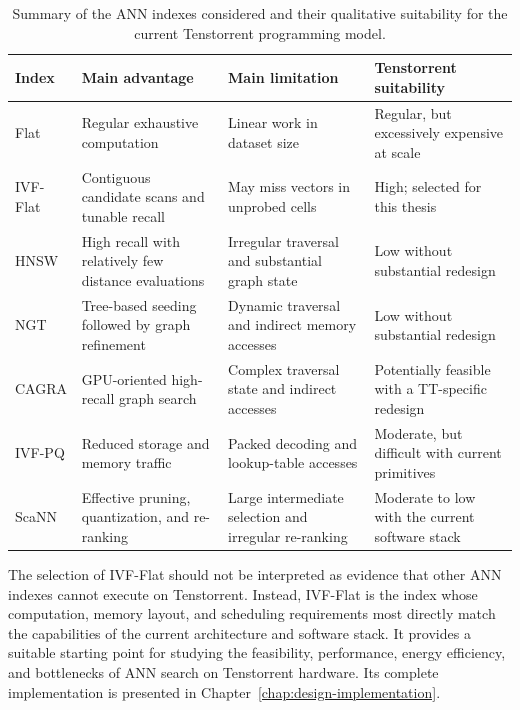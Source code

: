 \begin{table}[htbp]
\centering
\caption{Summary of the ANN indexes considered and their qualitative suitability for the current Tenstorrent programming model.}
\label{tab:ann-index-summary}
\small
\setlength{\tabcolsep}{4pt}
\renewcommand{\arraystretch}{1.15}
\begin{tabular}{p{1.6cm}p{2.5cm}p{2.7cm}p{3.7cm}}
\toprule
Index & Main advantage & Main limitation & Tenstorrent suitability \\
\midrule
Flat & Regular exhaustive computation & Linear work in dataset size & Regular, but excessively expensive at scale \\
IVF-Flat & Contiguous candidate scans and tunable recall & May miss vectors in unprobed cells & High; selected for this thesis \\
HNSW & High recall with relatively few distance evaluations & Irregular traversal and substantial graph state & Low without substantial redesign \\
NGT & Tree-based seeding followed by graph refinement & Dynamic traversal and indirect memory accesses & Low without substantial redesign \\
CAGRA & GPU-oriented high-recall graph search & Complex traversal state and indirect accesses & Potentially feasible with a TT-specific redesign \\
IVF-PQ & Reduced storage and memory traffic & Packed decoding and lookup-table accesses & Moderate, but difficult with current primitives \\
ScaNN & Effective pruning, quantization, and re-ranking & Large intermediate selection and irregular re-ranking & Moderate to low with the current software stack \\
\bottomrule
\end{tabular}
\end{table}

The selection of IVF-Flat should not be interpreted as evidence that other ANN indexes cannot execute on Tenstorrent. Instead, IVF-Flat is the index whose computation, memory layout, and scheduling requirements most directly match the capabilities of the current architecture and software stack. It provides a suitable starting point for studying the feasibility, performance, energy efficiency, and bottlenecks of ANN search on Tenstorrent hardware. Its complete implementation is presented in Chapter~\ref{chap:design-implementation}.

\cleardoublepage
